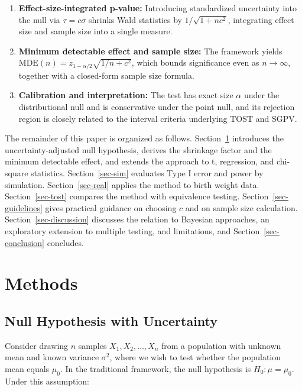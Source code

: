 \documentclass[
  11pt,
  letterpaper,
]{article}
\begin{document}
\begin{enumerate}
\def\labelenumi{\arabic{enumi}.}
\item
  \textbf{Effect-size-integrated p-value:} Introducing standardized
  uncertainty into the null via \(\tau = c\sigma\) shrinks Wald
  statistics by \(1/\sqrt{1+nc^2}\), integrating effect size and sample
  size into a single measure.
\item
  \textbf{Minimum detectable effect and sample size:} The framework
  yields \(\text{MDE}(n) = z_{1-\alpha/2}\sqrt{1/n + c^2}\), which
  bounds significance even as \(n \to \infty\), together with a
  closed-form sample size formula.
\item
  \textbf{Calibration and interpretation:} The test has exact size
  \(\alpha\) under the distributional null and is conservative under the
  point null, and its rejection region is closely related to the
  interval criteria underlying TOST and SGPV.
\end{enumerate}

The remainder of this paper is organized as follows.
Section~\ref{sec-methods} introduces the uncertainty-adjusted null
hypothesis, derives the shrinkage factor and the minimum detectable
effect, and extends the approach to t, regression, and chi-square
statistics. Section~\ref{sec-sim} evaluates Type I error and power by
simulation. Section~\ref{sec-real} applies the method to birth weight
data. Section~\ref{sec-tost} compares the method with equivalence
testing. Section~\ref{sec-guidelines} gives practical guidance on
choosing \(c\) and on sample size calculation.
Section~\ref{sec-discussion} discusses the relation to Bayesian
approaches, an exploratory extension to multiple testing, and
limitations, and Section~\ref{sec-conclusion} concludes.

\section{Methods}\label{sec-methods}

\subsection{Null Hypothesis with
Uncertainty}\label{null-hypothesis-with-uncertainty}

Consider drawing \(n\) samples \(X_1, X_2, \ldots, X_n\) from a
population with unknown mean and known variance \(\sigma^2\), where we
wish to test whether the population mean equals \(\mu_0\). In the
traditional framework, the null hypothesis is \(H_0: \mu = \mu_0\).
Under this assumption:
\end{document}
